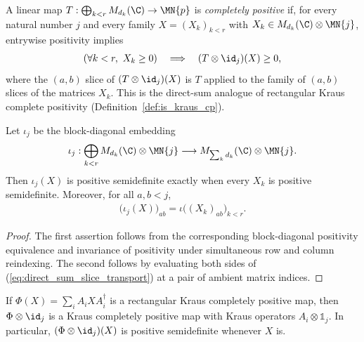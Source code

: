 \begin{definition}
    \label{def:cp_map_direct_sum}
    \leanok
    A linear map $T:\bigoplus_{k<r}M_{d_k}(\C)\to\MN{p}$ is \emph{completely
    positive} if, for every natural number $j$ and every family
    $X=(X_k)_{k<r}$ with $X_k\in M_{d_k}(\C)\otimes\MN{j}$,
    entrywise positivity implies
    \begin{align}
        (\forall k<r,\ X_k\ge0)
        \quad\Longrightarrow\quad (T\otimes\id_j)(X)\ge0,
        \label{eq:cp_direct_sum_ampliation}
    \end{align}
    where the $(a,b)$ slice of $(T\otimes\id_j)(X)$ is $T$ applied to the
    family of $(a,b)$ slices of the matrices $X_k$. This is the direct-sum
    analogue of rectangular Kraus complete positivity
    (Definition~\ref{def:is_kraus_cp}).
\end{definition}

\begin{theorem}
    \label{thm:direct_sum_level_transport}
    \leanok
    Let $\iota_j$ be the block-diagonal embedding
    \begin{align}
        \iota_j:\bigoplus_{k<r}
          M_{d_k}(\C)\otimes\MN{j}
          \longrightarrow M_{\sum_kd_k}(\C)\otimes\MN{j}.
    \end{align}
    Then $\iota_j(X)$ is positive semidefinite exactly when every $X_k$ is
    positive semidefinite. Moreover, for all $a,b<j$,
    \begin{align}
        \bigl(\iota_j(X)\bigr)_{ab}
        =\iota\bigl((X_k)_{ab}\bigr)_{k<r}.
        \label{eq:direct_sum_slice_transport}
    \end{align}
\end{theorem}

\begin{proof}\leanok
    The first assertion follows from the corresponding block-diagonal
    positivity equivalence and invariance of positivity under simultaneous
    row and column reindexing. The second follows by evaluating both sides of
    (\ref{eq:direct_sum_slice_transport}) at a pair of ambient matrix indices.
\end{proof}

\begin{theorem}
    \label{thm:kraus_cp_tensor_id}
    \leanok
    If $\Phi(X)=\sum_iA_iXA_i^\dagger$ is a rectangular Kraus completely
    positive map, then $\Phi\otimes\id_j$ is a Kraus completely positive
    map with Kraus operators $A_i\otimes\mathbb1_j$. In particular,
    $(\Phi\otimes\id_j)(X)$ is positive semidefinite whenever $X$ is.
\end{theorem}

